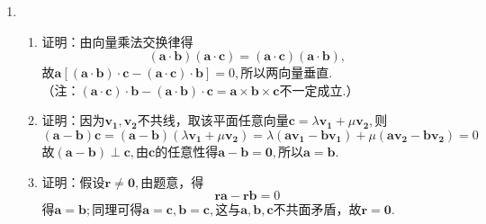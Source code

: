 \documentclass[UTF8]{ctexart}
\begin{document}
\begin{enumerate}
\item \begin{enumerate}[(1)]
\item 证明：由向量乘法交换律得$$\left(\mathbf{a}\cdot\mathbf{b}\right)\left(\mathbf{a}\cdot\mathbf{c}\right)=\left(\mathbf{a}\cdot\mathbf{c}\right)\left(\mathbf{a}\cdot\mathbf{b}\right),$$故$\mathbf{a}\left[\left(\mathbf{a}\cdot\mathbf{b}\right)\cdot\mathbf{c}-\left(\mathbf{a}\cdot\mathbf{c}\right)\cdot\mathbf{b}\right]=0,$所以两向量垂直. \\
（注：$\left(\mathbf{a}\cdot\mathbf{c}\right)\cdot\mathbf{b}-\left(\mathbf{a}\cdot\mathbf{b}\right)\cdot\mathbf{c}=\mathbf{a}\times\mathbf{b}\times\mathbf{c}$不一定成立.）

\item 证明：因为$\mathbf{v_1},\mathbf{v_2}$不共线，取该平面任意向量$\mathbf{c}=\lambda\mathbf{v_1}+\mu\mathbf{v_2},$则$$\left(\mathbf{a}-\mathbf{b}\right)\mathbf{c}=\left(\mathbf{a}-\mathbf{b}\right)\left(\lambda\mathbf{v_1}+\mu\mathbf{v_2}\right)=\lambda\left(\mathbf{a}\mathbf{v_1}-\mathbf{b}\mathbf{v_1}\right)+\mu\left(\mathbf{a}\mathbf{v_2}-\mathbf{b}\mathbf{v_2}\right)=0$$故$\left(\mathbf{a}-\mathbf{b}\right)\perp\mathbf{c},$由$\mathbf{c}$的任意性得$\mathbf{a}-\mathbf{b}=\mathbf{0},$所以$\mathbf{a}=\mathbf{b}.$

\item 证明：假设$\mathbf{r}\neq\mathbf{0},$由题意，得$$\mathbf{r}\mathbf{a}-\mathbf{r}\mathbf{b}=0$$得$\mathbf{a}=\mathbf{b};$同理可得$\mathbf{a}=\mathbf{c},\mathbf{b}=\mathbf{c},$这与$\mathbf{a},\mathbf{b},\mathbf{c}$不共面矛盾，故$\mathbf{r}=\mathbf{0}.$
\end{enumerate}
\end{enumerate}
\end{document}

